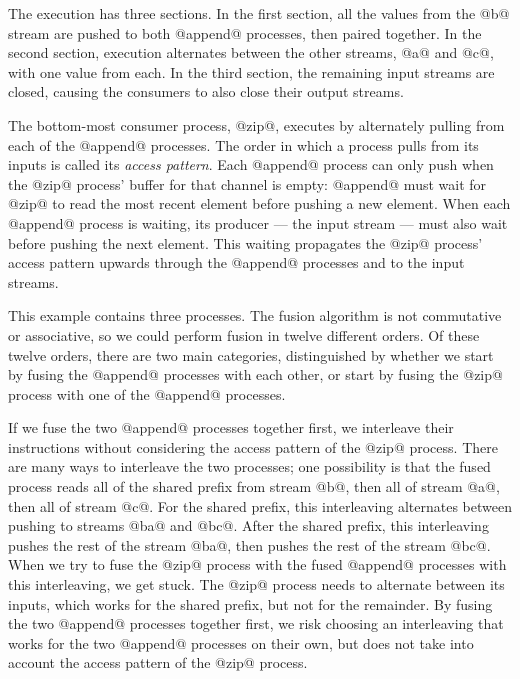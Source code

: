 The execution has three sections.
In the first section, all the values from the @b@ stream are pushed to both @append@ processes, then paired together.
In the second section, execution alternates between the other streams, @a@ and @c@, with one value from each.
In the third section, the remaining input streams are closed, causing the consumers to also close their output streams.

The bottom-most consumer process, @zip@, executes by alternately pulling from each of the @append@ processes.
The order in which a process pulls from its inputs is called its \emph{access pattern}.
Each @append@ process can only push when the @zip@ process' buffer for that channel is empty: @append@ must wait for @zip@ to read the most recent element before pushing a new element.
When each @append@ process is waiting, its producer --- the input stream --- must also wait before pushing the next element.
This waiting propagates the @zip@ process' access pattern upwards through the @append@ processes and to the input streams.

This example contains three processes.
The fusion algorithm is not commutative or associative, so we could perform fusion in twelve different orders.
Of these twelve orders, there are two main categories, distinguished by whether we start by fusing the @append@ processes with each other, or start by fusing the @zip@ process with one of the @append@ processes.

If we fuse the two @append@ processes together first, we interleave their instructions without considering the access pattern of the @zip@ process.
There are many ways to interleave the two processes; one possibility is that the fused process reads all of the shared prefix from stream @b@, then all of stream @a@, then all of stream @c@.
For the shared prefix, this interleaving alternates between pushing to streams @ba@ and @bc@.
After the shared prefix, this interleaving pushes the rest of the stream @ba@, then pushes the rest of the stream @bc@.
When we try to fuse the @zip@ process with the fused @append@ processes with this interleaving, we get stuck.
The @zip@ process needs to alternate between its inputs, which works for the shared prefix, but not for the remainder.
By fusing the two @append@ processes together first, we risk choosing an interleaving that works for the two @append@ processes on their own, but does not take into account the access pattern of the @zip@ process.

